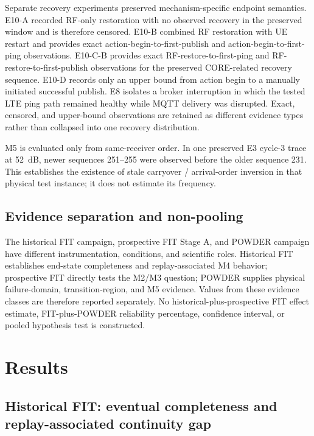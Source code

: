 \documentclass[journal]{IEEEtran}
\begin{document}
Separate recovery experiments preserved mechanism-specific endpoint semantics. E10-A recorded RF-only restoration with no observed recovery in the preserved window and is therefore censored. E10-B combined RF restoration with UE restart and provides exact action-begin-to-first-publish and action-begin-to-first-ping observations. E10-C-B provides exact RF-restore-to-first-ping and RF-restore-to-first-publish observations for the preserved CORE-related recovery sequence. E10-D records only an upper bound from action begin to a manually initiated successful publish. E8 isolates a broker interruption in which the tested LTE ping path remained healthy while MQTT delivery was disrupted. Exact, censored, and upper-bound observations are retained as different evidence types rather than collapsed into one recovery distribution.

M5 is evaluated only from same-receiver order. In one preserved E3 cycle-3 trace at 52~dB, newer sequences 251--255 were observed before the older sequence 231. This establishes the existence of stale carryover / arrival-order inversion in that physical test instance; it does not estimate its frequency.

\subsection{Evidence separation and non-pooling}

The historical FIT campaign, prospective FIT Stage A, and POWDER campaign have different instrumentation, conditions, and scientific roles. Historical FIT establishes end-state completeness and replay-associated M4 behavior; prospective FIT directly tests the M2/M3 question; POWDER supplies physical failure-domain, transition-region, and M5 evidence. Values from these evidence classes are therefore reported separately. No historical-plus-prospective FIT effect estimate, FIT-plus-POWDER reliability percentage, confidence interval, or pooled hypothesis test is constructed.

\section{Results}
\label{sec:results}

\subsection{Historical FIT: eventual completeness and replay-associated continuity gap}
\end{document}
